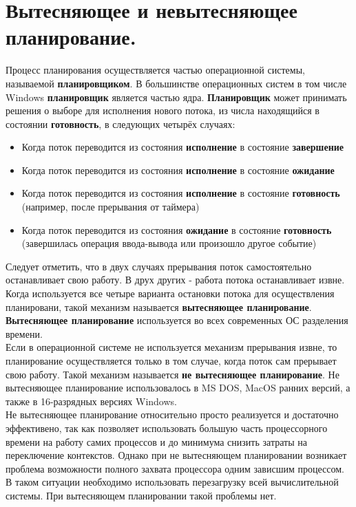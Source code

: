 \documentclass[a4paper]{article}
\begin{document}
\section{Вытесняющее и невытесняющее планирование.}
\setcounter{subsection}{0}
Процесс планирования осуществляется частью операционной системы, называемой \textbf{планировщиком}. В большинстве операционных систем в том числе Windows \textbf{планировщик} является частью ядра. \textbf{Планировщик} может принимать решения о выборе для исполнения нового потока, из числа находящийся в состоянии \textbf{готовность}, в следующих четырёх случаях:
\begin{itemize}
        \item Когда поток переводится из состояния \textbf{исполнение} в состояние \textbf{завершение}
	\item Когда поток переводится из состояния \textbf{исполнение} в состояние \textbf{ожидание}
        \item Когда поток переводится из состояния \textbf{исполнение} в состояние \textbf{готовность} (например, после прерывания от таймера)	
        \item Когда поток переводится из состояния \textbf{ожидание} в состояние \textbf{готовность} (завершилась операция ввода-вывода или произошло другое событие)
\end{itemize}
Следует отметить, что в двух случаях прерывания поток самостоятельно останавливает свою работу. В друх других - работа потока останавливает извне.\\
Когда используется все четыре варианта остановки потока для осуществления планировани, такой механизм называется \textbf{вытесняющее планирование}. \textbf{Вытесняющее планирование} используется во всех современных ОС разделения времени.\\
Если в операционной системе не используется механизм прерывания извне, то планирование осуществляется только в том случае, когда поток сам прерывает свою работу. Такой механизм называется \textbf{не вытесняющее планирование}. 
Не вытесняющее планирование использовалось в MS DOS, MacOS ранних версий, а также в 16-разрядных версиях Windows.\\
Не вытесняющее планирование относительно просто реализуется и достаточно эффективено, так как позволяет использовать большую часть процессорного времени на работу самих процессов и до минимума снизить затраты на переключение контекстов. Однако при не вытесняющем планировании возникает проблема возможности полного захвата процессора одним зависшим процессом. В таком ситуации необходимо использовать перезагрузку всей вычислительной системы. При вытесняющем планировании такой проблемы нет.
\end{document}
